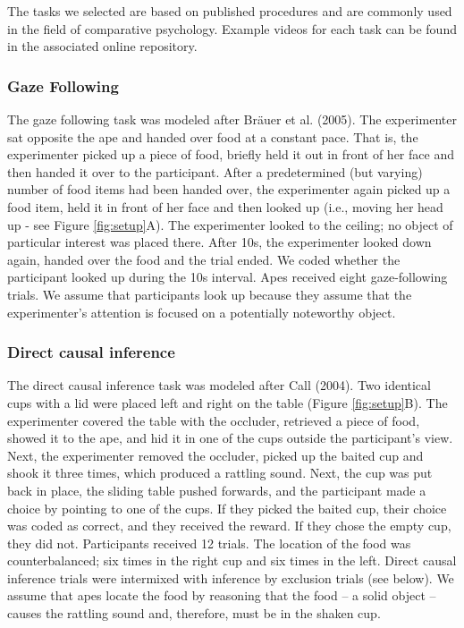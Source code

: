 \documentclass[
  man,floatsintext]{apa6}
\begin{document}
The tasks we selected are based on published procedures and are commonly used in the field of comparative psychology. Example videos for each task can be found in the associated online repository.

\hypertarget{gaze-following}{%
\subsubsection{Gaze Following}\label{gaze-following}}

The gaze following task was modeled after Bräuer et al. (2005). The experimenter sat opposite the ape and handed over food at a constant pace. That is, the experimenter picked up a piece of food, briefly held it out in front of her face and then handed it over to the participant. After a predetermined (but varying) number of food items had been handed over, the experimenter again picked up a food item, held it in front of her face and then looked up (i.e., moving her head up - see Figure \ref{fig:setup}A). The experimenter looked to the ceiling; no object of particular interest was placed there. After 10s, the experimenter looked down again, handed over the food and the trial ended. We coded whether the participant looked up during the 10s interval. Apes received eight gaze-following trials. We assume that participants look up because they assume that the experimenter's attention is focused on a potentially noteworthy object.

\hypertarget{direct-causal-inference}{%
\subsubsection{Direct causal inference}\label{direct-causal-inference}}

The direct causal inference task was modeled after Call (2004). Two identical cups with a lid were placed left and right on the table (Figure \ref{fig:setup}B). The experimenter covered the table with the occluder, retrieved a piece of food, showed it to the ape, and hid it in one of the cups outside the participant's view. Next, the experimenter removed the occluder, picked up the baited cup and shook it three times, which produced a rattling sound. Next, the cup was put back in place, the sliding table pushed forwards, and the participant made a choice by pointing to one of the cups. If they picked the baited cup, their choice was coded as correct, and they received the reward. If they chose the empty cup, they did not. Participants received 12 trials. The location of the food was counterbalanced; six times in the right cup and six times in the left. Direct causal inference trials were intermixed with inference by exclusion trials (see below). We assume that apes locate the food by reasoning that the food -- a solid object -- causes the rattling sound and, therefore, must be in the shaken cup.
\end{document}
